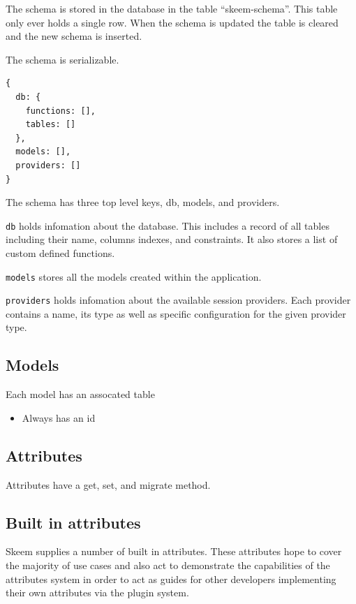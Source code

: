 \documentclass[
  12pt,
]{article}
\newcommand{\passthrough}[1]{#1}
\providecommand{\tightlist}{%
  \setlength{\itemsep}{0pt}\setlength{\parskip}{0pt}}
\begin{document}
The schema is stored in the database in the table ``skeem-schema''. This
table only ever holds a single row. When the schema is updated the table
is cleared and the new schema is inserted.

The schema is serializable.

\begin{lstlisting}[caption={The empty schema}]
 {
  db: {
    functions: [],
    tables: []
  },
  models: [],
  providers: []
}
\end{lstlisting}

The schema has three top level keys, db, models, and providers.

\passthrough{\lstinline!db!} holds infomation about the database. This
includes a record of all tables including their name, columns indexes,
and constraints. It also stores a list of custom defined functions.

\passthrough{\lstinline!models!} stores all the models created within
the application.

\passthrough{\lstinline!providers!} holds infomation about the available
session providers. Each provider contains a name, its type as well as
specific configuration for the given provider type.

\hypertarget{models-1}{%
\subsection{Models}\label{models-1}}

Each model has an assocated table

\begin{itemize}
\tightlist
\item
  Always has an id
\end{itemize}

\hypertarget{attributes-2}{%
\subsection{Attributes}\label{attributes-2}}

Attributes have a get, set, and migrate method.

\hypertarget{built-in-attributes}{%
\subsection{Built in attributes}\label{built-in-attributes}}

Skeem supplies a number of built in attributes. These attributes hope to
cover the majority of use cases and also act to demonstrate the
capabilities of the attributes system in order to act as guides for
other developers implementing their own attributes via the plugin
system.
\end{document}
